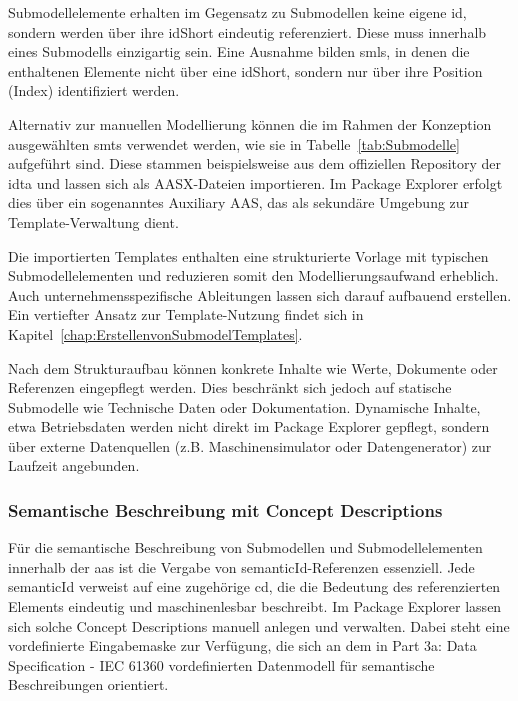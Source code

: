 Submodellelemente erhalten im Gegensatz zu Submodellen keine eigene \acs{id}, sondern werden über ihre idShort eindeutig referenziert.
Diese muss innerhalb eines Submodells einzigartig sein.
Eine Ausnahme bilden \acsp{sml}, in denen die enthaltenen Elemente nicht über eine idShort, sondern nur über ihre Position (Index) identifiziert werden.

Alternativ zur manuellen Modellierung können die im Rahmen der Konzeption ausgewählten \acsp{smt} verwendet werden, wie sie in Tabelle~\ref{tab:Submodelle} aufgeführt sind.
Diese stammen beispielsweise aus dem offiziellen Repository der \acs{idta} \cite{idtaTemplates} und lassen sich als AASX-Dateien importieren.
Im Package Explorer erfolgt dies über ein sogenanntes Auxiliary AAS, das als sekundäre Umgebung zur Template-Verwaltung dient.

Die importierten Templates enthalten eine strukturierte Vorlage mit typischen Submodellelementen und reduzieren somit den Modellierungsaufwand erheblich.
Auch unternehmensspezifische Ableitungen lassen sich darauf aufbauend erstellen.
Ein vertiefter Ansatz zur Template-Nutzung findet sich in Kapitel~\ref{chap:ErstellenvonSubmodelTemplates}.

Nach dem Strukturaufbau können konkrete Inhalte wie Werte, Dokumente oder Referenzen eingepflegt werden.
Dies beschränkt sich jedoch auf statische Submodelle wie Technische Daten oder Dokumentation.
Dynamische Inhalte, etwa Betriebsdaten werden nicht direkt im Package Explorer gepflegt, sondern über externe Datenquellen (z.B. Maschinensimulator oder Datengenerator) zur Laufzeit angebunden.

\subsubsection*{Semantische Beschreibung mit Concept Descriptions}
\vspace{-0.5em}

Für die semantische Beschreibung von Submodellen und Submodellelementen innerhalb der \acs{aas} ist die Vergabe von semanticId-Referenzen essenziell.
Jede semanticId verweist auf eine zugehörige \acs{cd}, die die Bedeutung des referenzierten Elements eindeutig und maschinenlesbar beschreibt.
Im Package Explorer lassen sich solche Concept Descriptions manuell anlegen und verwalten.
Dabei steht eine vordefinierte Eingabemaske zur Verfügung, die sich an dem in Part 3a: Data Specification - IEC 61360 \cite{SpezifikationPart3a} vordefinierten Datenmodell für semantische Beschreibungen orientiert.

